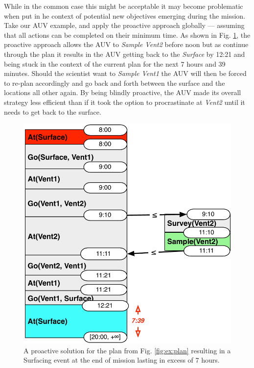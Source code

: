 
While in the common case this might be acceptable it
may become problematic when put in he context of potential new
objectives emerging during the mission.  Take our AUV example,
and apply the proactive approach globally --- assuming that all actions
can be completed on their minimum time.  As shown in 
Fig. \ref{fig:ex:proactive}, the proactive approach allows the
AUV to {\em Sample Vent2} before noon but as continue through
the plan it results in the AUV getting back to the {\em Surface}
by 12:21 and being stuck in the context of the current plan for the
next 7 hours and 39 minutes. Should the scientist want to {\em Sample Vent1}
the AUV will then be forced to re-plan accordingly and
go back and forth between the surface and the locations all other
again. By being blindly proactive, the AUV made its overall strategy
less efficient than if it took the option to procrastinate at {\em Vent2}
until it needs to get back to the surface. 


\begin{figure}
  \centering
  \includegraphics[width=0.65\columnwidth]{figs/example_early}
  \caption{\small A proactive solution for the plan from
    Fig. \ref{fig:ex:plan} resulting in a Surfacing event at the end
    of mission lasting in excess of $7$ hours.}
  \label{fig:ex:proactive}
\end{figure}


